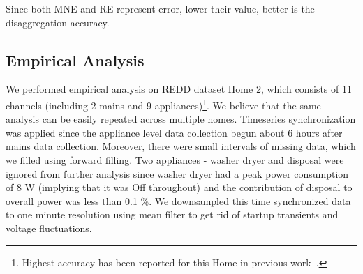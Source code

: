 \documentclass[conference]{IEEEtran}
\begin{document}
\noindent Since both MNE and RE represent error, lower their value, better is the disaggregation accuracy. 




\vspace{-3mm}
\subsection{Empirical Analysis}
\vspace{-1mm}
\noindent We performed empirical analysis on REDD dataset Home 2, which consists of 11 channels (including 2 mains and 9 appliances)\footnote{Highest accuracy has been reported for this Home in previous work~\cite{redd}.}. We believe that the same analysis can be easily repeated across multiple homes. Timeseries synchronization was applied since the appliance level data collection begun about 6 hours after mains data collection. Moreover, there were small intervals of missing data, which we filled using forward filling. Two appliances - washer dryer and disposal were ignored from further analysis since washer dryer had a peak power consumption of 8 W (implying that it was Off throughout) and the contribution of disposal to overall power was less than 0.1 \%.  We downsampled this time synchronized data to one minute resolution using mean filter to get rid of startup transients and voltage fluctuations. 
\end{document}
